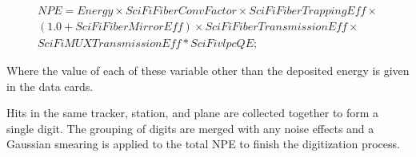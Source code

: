 \begin{multline}
NPE = Energy \times SciFiFiberConvFactor \times SciFiFiberTrappingEff \times \\
      ( 1.0 + SciFiFiberMirrorEff ) \times SciFiFiberTransmissionEff \times \\
      SciFiMUXTransmissionEff * SciFivlpcQE;
\end{multline}

\noindent
Where the value of each of these variable other than the deposited energy is given in the data cards.

Hits in the same tracker, station, and plane are collected together to form a single digit.  The grouping of digits are merged with any noise effects and a Gaussian smearing is applied to the total NPE to finish the digitization process.
